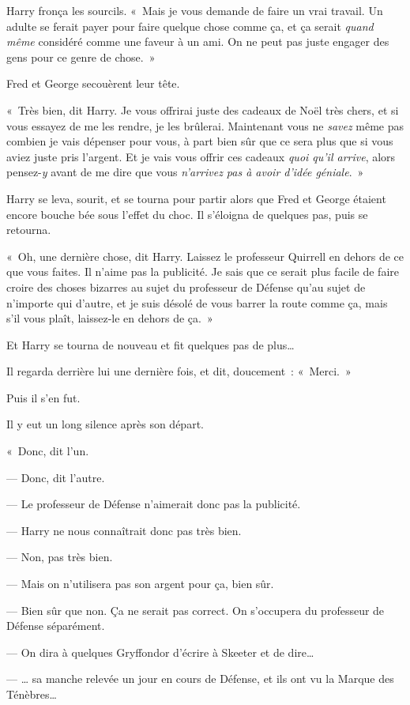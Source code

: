 Harry fronça les sourcils.
«~Mais je vous demande de faire un vrai travail.
Un adulte se ferait payer pour faire quelque chose comme ça, et ça serait \emph{quand même} considéré comme une faveur à un ami.
On ne peut pas juste engager des gens pour ce genre de chose.~»

Fred et George secouèrent leur tête.

«~Très bien, dit Harry.
Je vous offrirai juste des cadeaux de Noël très chers, et si vous essayez de me les rendre, je les brûlerai.
Maintenant vous ne \emph{savez} même pas combien je vais dépenser pour vous, à part bien sûr que ce sera plus que si vous aviez juste pris l'argent.
Et je vais vous offrir ces cadeaux \emph{quoi qu'il arrive}, alors pensez-\emph{y} avant de me dire que vous \emph{n'arrivez pas à avoir d'idée géniale}.~»

Harry se leva, sourit, et se tourna pour partir alors que Fred et George étaient encore bouche bée sous l'effet du choc.
Il s'éloigna de quelques pas, puis se retourna.

«~Oh, une dernière chose, dit Harry.
Laissez le professeur Quirrell en dehors de ce que vous faites.
Il n'aime pas la publicité.
Je sais que ce serait plus facile de faire croire des choses bizarres au sujet du professeur de Défense qu'au sujet de n'importe qui d'autre, et je suis désolé de vous barrer la route comme ça, mais s'il vous plaît, laissez-le en dehors de ça.~»

Et Harry se tourna de nouveau et fit quelques pas de plus…

Il regarda derrière lui une dernière fois, et dit, doucement~: «~Merci.~»

Puis il s'en fut.

Il y eut un long silence après son départ.

«~Donc, dit l'un.

--- Donc, dit l'autre.

--- Le professeur de Défense n'aimerait donc pas la publicité.

--- Harry ne nous connaîtrait donc pas très bien.

--- Non, pas très bien.

--- Mais on n'utilisera pas son argent pour ça, bien sûr.

--- Bien sûr que non.
Ça ne serait pas correct.
On s'occupera du professeur de Défense séparément.

--- On dira à quelques Gryffondor d'écrire à Skeeter et de dire…

--- … sa manche relevée un jour en cours de Défense, et ils ont vu la Marque des Ténèbres…

